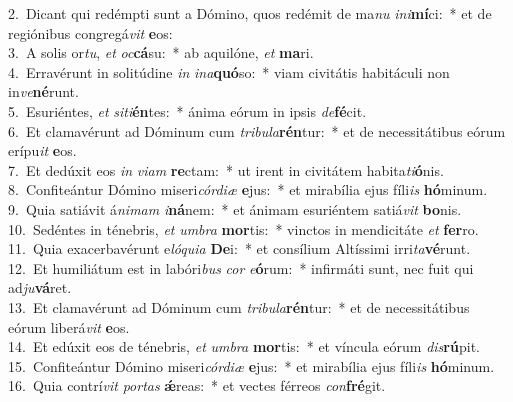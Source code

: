 {2.~}Dicant qui redémpti sunt a Dómino, quos redémit de ma\textit{nu} \textit{i}\textit{ni}\textbf{mí}ci:~* et de regiónibus congregá\textit{vit} \textbf{e}os:\\
{3.~}A solis or\textit{tu}, \textit{et} \textit{oc}\textbf{cá}su:~* ab aquilóne, \textit{et} \textbf{ma}ri.\\
{4.~}Erravérunt in solitúdine \textit{in} \textit{i}\textit{na}\textbf{quó}so:~* viam civitátis habitáculi non in\textit{ve}\textbf{né}runt.\\
{5.~}Esuriéntes, \textit{et} \textit{si}\textit{ti}\textbf{én}tes:~* ánima eórum in ipsis \textit{de}\textbf{fé}cit.\\
{6.~}Et clamavérunt ad Dóminum cum \textit{tri}\textit{bu}\textit{la}\textbf{rén}tur:~* et de necessitátibus eórum erípu\textit{it} \textbf{e}os.\\
{7.~}Et dedúxit eos \textit{in} \textit{vi}\textit{am} \textbf{re}ctam:~* ut irent in civitátem habita\textit{ti}\textbf{ó}nis.\\
{8.~}Confiteántur Dómino miseri\textit{cór}\textit{di}\textit{æ} \textbf{e}jus:~* et mirabília ejus fíli\textit{is} \textbf{hó}minum.\\
{9.~}Quia satiávit á\textit{ni}\textit{mam} \textit{i}\textbf{ná}nem:~* et ánimam esuriéntem satiá\textit{vit} \textbf{bo}nis.\\
{10.~}Sedéntes in ténebris, \textit{et} \textit{um}\textit{bra} \textbf{mor}tis:~* vinctos in mendicitáte \textit{et} \textbf{fer}ro.\\
{11.~}Quia exacerbavérunt e\textit{ló}\textit{qui}\textit{a} \textbf{De}i:~* et consílium Altíssimi irri\textit{ta}\textbf{vé}runt.\\
{12.~}Et humiliátum est in labóri\textit{bus} \textit{cor} \textit{e}\textbf{ó}rum:~* infirmáti sunt, nec fuit qui ad\textit{ju}\textbf{vá}ret.\\
{13.~}Et clamavérunt ad Dóminum cum \textit{tri}\textit{bu}\textit{la}\textbf{rén}tur:~* et de necessitátibus eórum liberá\textit{vit} \textbf{e}os.\\
{14.~}Et edúxit eos de ténebris, \textit{et} \textit{um}\textit{bra} \textbf{mor}tis:~* et víncula eórum \textit{dis}\textbf{rú}pit.\\
{15.~}Confiteántur Dómino miseri\textit{cór}\textit{di}\textit{æ} \textbf{e}jus:~* et mirabília ejus fíli\textit{is} \textbf{hó}minum.\\
{16.~}Quia contrí\textit{vit} \textit{por}\textit{tas} \textbf{ǽ}reas:~* et vectes férreos \textit{con}\textbf{fré}git.\\
